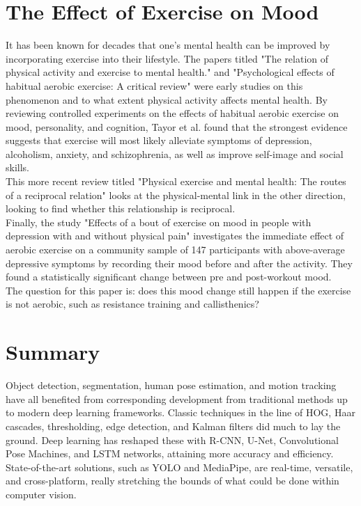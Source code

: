 \section{The Effect of Exercise on Mood}
    It has been known for decades that one's mental health can be improved by incorporating exercise into their lifestyle. The papers titled "The relation of physical activity and exercise to mental health." \citep{taylor1985relation} and "Psychological effects of habitual aerobic exercise: A critical review" \citep{hughes1984psychological} were early studies on this phenomenon and to what extent physical activity affects mental health. By reviewing controlled experiments on the effects of habitual aerobic exercise on mood, personality, and cognition, Tayor et al. found that the strongest evidence suggests that exercise will most likely alleviate symptoms of depression, alcoholism, anxiety, and schizophrenia, as well as improve self-image and social skills.\\
    This more recent review titled "Physical exercise and mental health: The routes of a reciprocal relation" \citep{fossati2021physical} looks at the physical-mental link in the other direction, looking to find whether this relationship is reciprocal.\\
    Finally, the study "Effects of a bout of exercise on mood in people with depression with and without physical pain" \citep{caviness2023effects} investigates the immediate effect of aerobic exercise on a community sample of 147 participants with above-average depressive symptoms by recording their mood before and after the activity. They found a statistically significant change between pre and post-workout mood.\\
    The question for this paper is: does this mood change still happen if the exercise is not aerobic, such as resistance training and callisthenics?

\section{Summary}
    Object detection, segmentation, human pose estimation, and motion tracking have all benefited from corresponding development from traditional methods up to modern deep learning frameworks. Classic techniques in the line of HOG, Haar cascades, thresholding, edge detection, and Kalman filters did much to lay the ground. Deep learning has reshaped these with R-CNN, U-Net, Convolutional Pose Machines, and LSTM networks, attaining more accuracy and efficiency. State-of-the-art solutions, such as YOLO and MediaPipe, are real-time, versatile, and cross-platform, really stretching the bounds of what could be done within computer vision.
